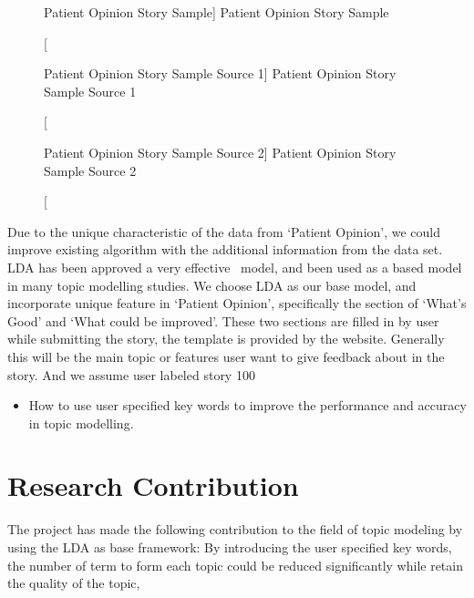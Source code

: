 \documentclass[11pt,twoside]{report}
\begin{document}
\begin{figure}[tp]
    \begin{center}
    \caption
    [Patient Opinion Story Sample]
    {
    Patient Opinion Story Sample
    \label{Figure1}
    }
    \end{center}
\end{figure}

\begin{figure}[h]
    \begin{center}
    \caption
    [Patient Opinion Story Sample Source 1]
    {
    Patient Opinion Story Sample Source 1
    \label{Figure2}
    }
    \end{center}
\end{figure}

\begin{figure}[h]
    \begin{center}
    \caption
    [Patient Opinion Story Sample Source 2]
    {
    Patient Opinion Story Sample Source 2
    \label{Figure3}
    }
    \end{center}
\end{figure}

Due to the unique characteristic of the data from ‘Patient Opinion’, we could improve existing algorithm with the additional information from the data set. LDA has been approved a very effective  model, and been used as a based model in many topic modelling studies. We choose LDA as our base model, and incorporate unique feature in ‘Patient Opinion’, specifically the section of ‘What’s Good’ and ‘What could be improved’. These two sections are filled in by user while submitting the story, the template is provided by the website. Generally this will be the main topic or features user want to give feedback about in the story. And we assume user labeled story 100%
\begin{itemize}
\item How to use user specified key words to improve the performance and accuracy in topic modelling.
\end{itemize}

\section{Research Contribution}
The project has made the following contribution to the field of topic modeling by using the LDA as base framework:
By introducing the user specified key words, the number of term to form each topic could be reduced significantly while retain the quality of the topic,
\end{document}
